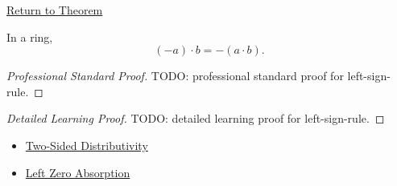 \newpage
{}
\label{prf:left-sign-rule}

\begin{remark*}[Return]
\hyperref[prop:left-sign-rule]{Return to Theorem}
\end{remark*}

\begin{proposition*}
In a ring,
\[
(-a)\cdot b=-(a\cdot b).
\]
\end{proposition*}

\begin{proof}[Professional Standard Proof]
\LRAProofBodyStart
TODO: professional standard proof for left-sign-rule.
\end{proof}

\begin{proof}[Detailed Learning Proof]
\LRAProofBodyStart
TODO: detailed learning proof for left-sign-rule.
\end{proof}

\begin{remark*}
\end{remark*}

\begin{dependencies}
\begin{itemize}
  \item \hyperref[def:two-sided-distributivity]{Two-Sided Distributivity}
  \item \hyperref[prop:left-zero-absorption]{Left Zero Absorption}
\end{itemize}
\end{dependencies}

\clearpage
